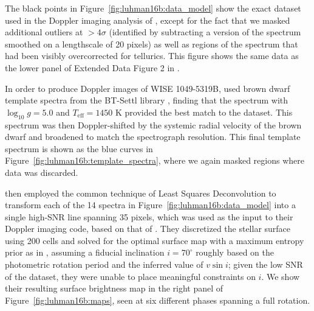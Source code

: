 \documentclass[modern]{aastex631}
\begin{document}
The black points in Figure~\ref{fig:luhman16b:data_model} show the exact dataset used in the Doppler imaging analysis of \citet{Crossfield2014}, except for the fact that we masked additional outliers at $>4\sigma$ (identified by subtracting a version of the spectrum smoothed on a lengthscale of 20 pixels) as well as regions of the spectrum that had been visibly overcorrected for tellurics.
This figure shows the same data as the lower panel of Extended Data Figure 2 in \citet{Crossfield2014}.

In order to produce Doppler images of WISE 1049-5319B, \citet{Crossfield2014} used brown dwarf template spectra from the BT-Settl library \citep{Allard2013}, finding that the spectrum with $\log_{10} g = 5.0$ and $T_\mathrm{eff} = 1450$ K provided the best match to the dataset.
This spectrum was then Doppler-shifted by the systemic radial velocity of the brown dwarf and broadened to match the spectrograph resolution.
This final template spectrum is shown as the blue curves in Figure~\ref{fig:luhman16b:template_spectra}, where we again masked regions where data was discarded.

\citet{Crossfield2014} then employed the common technique of Least Squares Deconvolution \citep[LSD;][]{Donati1997} to transform each of the 14 spectra in Figure~\ref{fig:luhman16b:data_model} into a single high-SNR line spanning 35 pixels, which was used as the input to their Doppler imaging code, based on that of \citet{Vogt1987}.
They discretized the stellar surface using 200 cells and solved for the optimal surface map with a maximum entropy prior as in \citet{Vogt1987}, assuming a fiducial inclination $i=70^\circ$ roughly based on the photometric rotation period and the inferred value of $v\sin i$; given the low SNR of the dataset, they were unable to place meaningful constraints on $i$.
We show their resulting surface brightness map in the right panel of Figure~\ref{fig:luhman16b:maps}, seen at six different phases spanning a full rotation.
\end{document}
